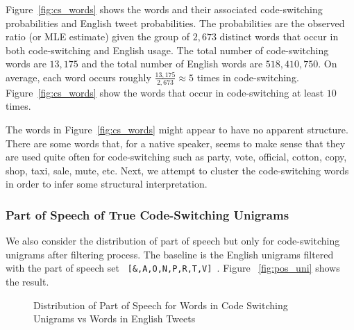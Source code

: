 \documentclass[conference]{IEEEtran}
\begin{document}
Figure~\ref{fig:cs_words} shows the words and their associated code-switching probabilities and English tweet probabilities. The probabilities are the observed ratio (or MLE estimate)  given  the group of $2,673$ distinct words that occur in both code-switching and English usage. The total number of code-switching words  are $13,175$ and the total number of English words are $518,410,750$. On average, each word occurs roughly $\frac{13,175}{2,673} \approx 5$ times in code-switching. Figure~\ref{fig:cs_words} show the words that occur in code-switching at least $10$ times. %


The words in Figure~\ref{fig:cs_words} might appear to have no apparent structure. There are some words that, for a native speaker, seems to make sense that they are used quite often for code-switching such as party, vote, official, cotton, copy, shop, taxi, sale, mute, etc. Next, we attempt to cluster the code-switching words in order to infer some structural interpretation. 






\subsubsection{Part of Speech of True Code-Switching Unigrams}
We also consider the distribution of part of speech  but only for  code-switching unigrams after filtering process. The baseline is the English unigrams filtered with the part of speech set \verb| [&,A,O,N,P,R,T,V] |. Figure ~\ref{fig:pos_uni} shows the result. 


\begin{figure}[H]
	\centering
	\hfill
{}\hfill
	\caption{Distribution of Part of Speech for Words in Code Switching Unigrams vs Words in English Tweets}
	\label{fig:pos_uni_goodPOS}
\end{figure}
\end{document}
